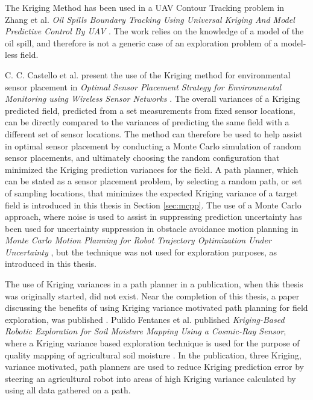 The Kriging Method has been used in a UAV Contour Tracking problem in Zhang et al. \textit{Oil Spills Boundary Tracking Using Universal Kriging And Model Predictive Control By UAV} \cite{zhang:oil_krig}. The work relies on the knowledge of a model of the oil spill, and therefore is not a generic case of an exploration problem of a model-less field.

C. C. Castello et al. present the use of the Kriging method for environmental sensor placement in \textit{Optimal Sensor Placement Strategy for Environmental Monitoring using Wireless Sensor Networks} \cite{kriging:sensorplacement}. The overall variances of a Kriging predicted field, predicted from a set measurements from fixed sensor locations, can be directly compared to the variances of predicting the same field with a different set of sensor locations. The method can therefore be used to help assist in optimal sensor placement by conducting a Monte Carlo simulation of random sensor placements, and ultimately choosing the random configuration that minimized the Kriging prediction variances for the field. A path planner, which can be stated as a sensor placement problem, by selecting a random path, or set of sampling locations, that minimizes the expected Kriging variance of a target field is introduced in this thesis in Section \ref{sec:mcpp}. The use of a Monte Carlo approach, where noise is used to assist in suppressing prediction uncertainty has been used for uncertainty suppression in obstacle avoidance motion planning in \textit{Monte Carlo Motion Planning for Robot Trajectory Optimization Under Uncertainty} \cite{janson:mcmp}, but the technique was not used for exploration purposes, as introduced in this thesis.

The use of Kriging variances in a path planner in a publication, when this thesis was originally started, did not exist. Near the completion of this thesis, a paper discussing the benefits of using Kriging variance motivated path planning for field exploration, was published \cite{fentanes:soilkrig}. Pulido Fentanes et al. published \textit{Kriging-Based Robotic Exploration for Soil Moisture Mapping Using a Cosmic-Ray Sensor}, where a Kriging variance based exploration technique is used for the purpose of quality mapping of agricultural soil moisture \cite{fentanes:soilkrig}. In the publication, three Kriging, variance motivated, path planners are used to reduce Kriging prediction error by steering an agricultural robot into areas of high Kriging variance calculated by using all data gathered on a path. 

